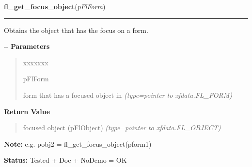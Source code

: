 \hspace{.8\funcindent}\begin{boxedminipage}{\funcwidth}

    \raggedright \textbf{fl\_get\_focus\_object}(\textit{pFlForm})

    \vspace{-1.5ex}

    \rule{\textwidth}{0.5\fboxrule}
\setlength{\parskip}{2ex}

Obtains the object that has the focus on a form.

-{}-
\setlength{\parskip}{1ex}
      \textbf{Parameters}
      \vspace{-1ex}

      \begin{quote}
        \begin{Ventry}{xxxxxxx}

          \item[pFlForm]


form that has a focused object in
            {\it (type=pointer to xfdata.FL\_FORM)}

        \end{Ventry}

      \end{quote}

      \textbf{Return Value}
    \vspace{-1ex}

      \begin{quote}

focused object (pFlObject)
      {\it (type=pointer to xfdata.FL\_OBJECT)}

      \end{quote}

\textbf{Note:} 
e.g. pobj2 = fl\_get\_focus\_object(pform1)


\textbf{Status:} 
Tested + Doc + NoDemo = OK


    \end{boxedminipage}

    \label{xformslib:flbasic:fl_reset_focus_object}

    \vspace{0.5ex}

